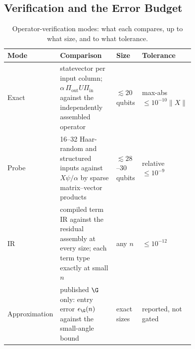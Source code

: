 \subsection{Verification and the Error Budget}
\label{sec:pipeline-verification}

\begin{table}[htbp]
    \centering
    \caption{Operator-verification modes: what each compares, up to what size, and to what tolerance.}
    \label{tab:verification-modes}
    \small
    \begin{tabular}{@{}l p{0.41\linewidth} p{0.14\linewidth} p{0.2\linewidth}@{}}
        \toprule
        Mode & Comparison & Size & Tolerance \\
        \midrule
        Exact & statevector per input column; $\alpha\,\Pi_{\mathrm{out}}U\Pi_{\mathrm{in}}$ against the independently assembled operator & $\lesssim 20$ qubits & max-abs $\le 10^{-10}\|X\|$ \\
        Probe & 16--32 Haar-random and structured inputs against $X\psi/\alpha$ by sparse matrix--vector products & $\lesssim 28$--$30$ qubits & relative $\le 10^{-9}$ \\
        IR & compiled term IR against the residual assembly at every size; each term type exactly at small $n$ & any $n$ & $\le 10^{-12}$ \\
        Approximation & published $\G$ only: entry error $\epsilon_{\G}(n)$ against the small-angle bound & exact sizes & reported, not gated \\
        \bottomrule
    \end{tabular}
\end{table}

